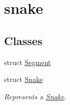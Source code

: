 \hypertarget{group__snake}{}\section{snake}
\label{group__snake}
\subsection*{Classes}
\begin{DoxyCompactItemize}
\item 
struct \hyperlink{structSegment}{Segment}
\item 
struct \hyperlink{structSnake}{Snake}
\begin{DoxyCompactList}\small\item\em Represents a \hyperlink{structSnake}{Snake}. \end{DoxyCompactList}\end{DoxyCompactItemize}
